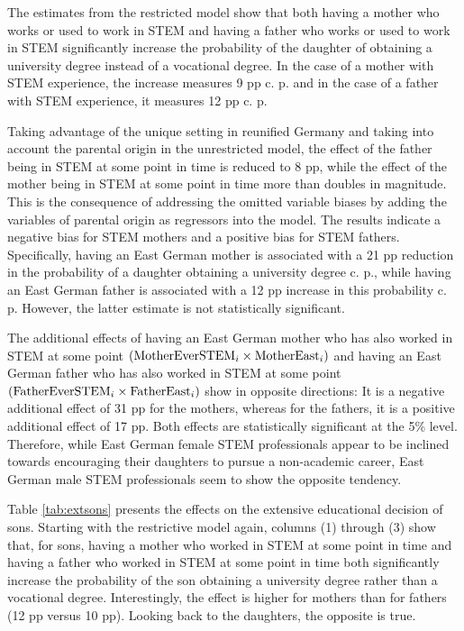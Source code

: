 \documentclass[a4paper, oneside, hyperfootnotes = false]{article}
\begin{document}
{The estimates from the restricted model show that both having a mother who works or used to work in STEM and having a father who works or used to work in STEM significantly increase the probability of the daughter of obtaining a university degree instead of a vocational degree.
In the case of a mother with STEM experience, the increase measures 9 pp c. p. and in the case of a father with STEM experience, it measures 12 pp c. p.

Taking advantage of the unique setting in reunified Germany and taking into account the parental origin in the unrestricted model, the effect of the father being in STEM at some point in time is reduced to 8 pp, while the effect of the mother being in STEM at some point in time more than doubles in magnitude.
This is the consequence of addressing the omitted variable biases by adding the variables of parental origin as regressors into the model.
The results indicate a negative bias for STEM mothers and a positive bias for STEM fathers.
Specifically, having an East German mother is associated with a 21 pp reduction in the probability of a daughter obtaining a university degree c. p., while having an East German father is associated with a 12 pp increase in this probability c. p.
However, the latter estimate is not statistically significant.

The additional effects of having an East German mother who has also worked in STEM at some point $(\textnormal{MotherEverSTEM}_{i} \times \textnormal{MotherEast}_{i})$  and having an East German father who has also worked in STEM at some point $(\textnormal{FatherEverSTEM}_{i} \times \textnormal{FatherEast}_{i})$ show in opposite directions:
It is a negative additional effect of 31 pp for the mothers, whereas for the fathers, it is a positive additional effect of 17 pp.
Both effects are statistically significant at the 5\% level.
Therefore, while East German female STEM professionals appear to be inclined towards encouraging their daughters to pursue a non-academic career, East German male STEM professionals seem to show the opposite tendency.

Table \ref{tab:extsons} presents the effects on the extensive educational decision of sons.
Starting with the restrictive model again, columns (1) through (3) show that, for sons, having a mother who worked in STEM at some point in time and having a father who worked in STEM at some point in time both significantly increase the probability of the son obtaining a university degree rather than a vocational degree.
Interestingly, the effect is higher for mothers than for fathers (12 pp versus 10 pp).
Looking back to the daughters, the opposite is true.

}
\end{document}
